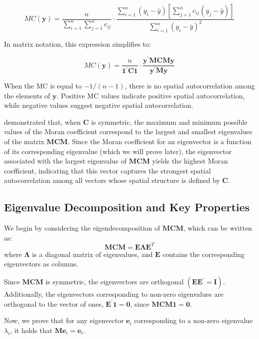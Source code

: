 \documentclass[12pt]{article}
\begin{document}
\[
M C(\mathbf{y}) = \frac{n}{\sum_{i=1}^n \sum_{j=1}^n c_{ij}} \cdot \frac{\sum_{i=1}^n \left(y_i - \bar{y} \right) \left[ \sum_{j=1}^n c_{ij} \left( y_j - \bar{y} \right) \right]}{\sum_{i=1}^n \left( y_i - \bar{y} \right)^2}
\]

In matrix notation, this expression simplifies to:

\[
M C(\mathbf{y}) = \frac{n}{\mathbf{1}^{\prime} \mathbf{C} \mathbf{1}} \cdot \frac{\mathbf{y}^{\prime} \mathbf{M C M y}}{\mathbf{y}^{\prime} \mathbf{M y}}
\]

When the MC is equal to \( -1 / (n-1) \), there is no spatial autocorrelation among the elements of \( \mathbf{y} \). Positive MC values indicate positive spatial autocorrelation, while negative values suggest negative spatial autocorrelation. 

\citet{de1984extreme} demonstrated that, when \( \mathbf{C} \) is symmetric, the maximum and minimum possible values of the Moran coefficient correspond to the largest and smallest eigenvalues of the matrix \( \mathbf{MCM} \). Since the Moran coefficient for an eigenvector is a function of its corresponding eigenvalue (which we will prove later), the eigenvector associated with the largest eigenvalue of \( \mathbf{MCM} \) yields the highest Moran coefficient, indicating that this vector captures the strongest spatial autocorrelation among all vectors whose spatial structure is defined by \( \mathbf{C} \).

\subsection*{Eigenvalue Decomposition and Key Properties}

We begin by considering the eigendecomposition of \( \mathbf{M C M} \), which can be written as:
\[
  \mathbf{M C M}=\mathbf{E} \boldsymbol{\Lambda} \mathbf{E}^{T}
\]
where \( \boldsymbol{\Lambda} \) is a diagonal matrix of eigenvalues, and \( \mathbf{E} \) contains the corresponding eigenvectors as columns.

Since \( \mathbf{M C M} \) is symmetric, the eigenvectors are orthogonal \( \left(\mathbf{E E}^{\prime}=\mathbf{I}\right) \). Additionally, the eigenvectors corresponding to non-zero eigenvalues are orthogonal to the vector of ones, \( \mathbf{E}^{\prime} \mathbf{1} = \mathbf{0} \), since \( \mathbf{M C M 1} = \mathbf{0} \).

Now, we prove that for any eigenvector \( \mathbf{e}_i \) corresponding to a non-zero eigenvalue \( \lambda_i \), it holds that \( \mathbf{M} \mathbf{e}_i = \mathbf{e}_i \).
\end{document}
